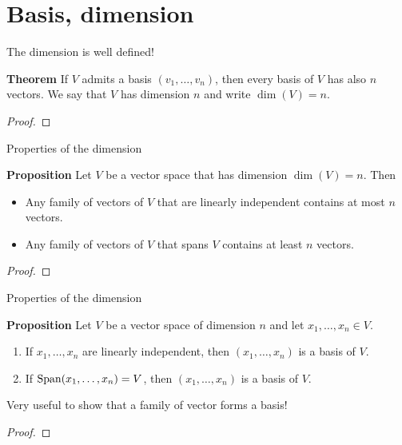 \documentclass{beamer}
\begin{document}
\section{Basis, dimension}
\begin{frame}[t]{The dimension is well defined!}
	\begin{block}{\bf Theorem}
		If $V$ admits a basis $(v_1, \dots, v_n)$, then every basis of $V$ has also $n$ vectors. We say that $V$ has dimension $n$ and write $\dim(V) = n$.
	\end{block}
	\begin{proof}
		\vspace{3cm}
		\vfill
	\end{proof}
\end{frame}
\begin{frame}[t]{Properties of the dimension}
	\vspace{-0.3cm}
	\begin{block}{\bf Proposition}
		Let $V$ be a vector space that has dimension $\dim(V) = n$. Then
		\begin{itemize}
			\item Any family of vectors of $V$ that are linearly independent contains at most $n$ vectors.
			\item Any family of vectors of $V$ that spans $V$ contains at least $n$ vectors.
		\end{itemize}
	\end{block}
	\begin{proof}
		\vspace{2cm}
		\vfill
	\end{proof}
	\pause
\end{frame}

\begin{frame}[t]{Properties of the dimension}
	\vspace{-0.3cm}
	\begin{block}{\bf Proposition}
	Let $V$ be a vector space of dimension $n$ and let $x_1, \dots, x_n \in V$.
	\begin{enumerate}
		\item If $x_1, \dots, x_n$ are linearly independent, then $(x_1, \dots, x_n)$ is a basis of $V$.
		\item If ${{\rm Span}}(x_1, \dots, x_n) = V$, then $(x_1, \dots, x_n)$ is a basis of $V$.
	\end{enumerate}
	\end{block}

	\vspace{0.5cm}

	Very useful to show that a family of vector forms a basis!

	\vspace{0.5cm}

	\begin{proof}
		\vfill
	\end{proof}
\end{frame}
\end{document}
